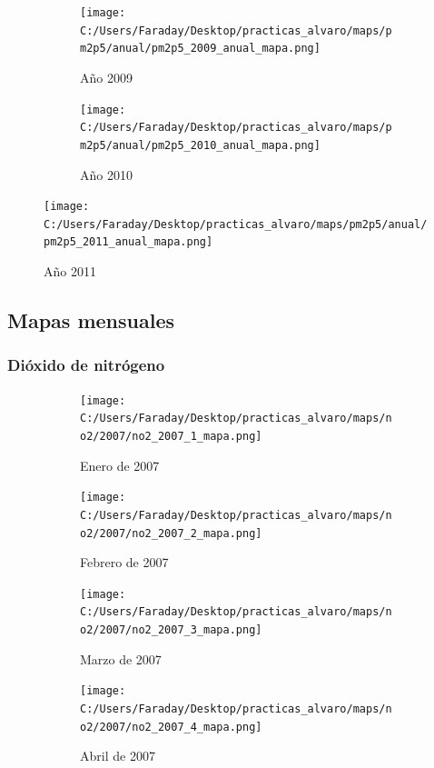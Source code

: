\documentclass[12pt]{article}
\begin{document}
\begin{figure}[H]
\centering
\begin{subfigure}[h]{0.45\textwidth}
\texttt{[image: C:/Users/Faraday/Desktop/practicas\_alvaro/maps/pm2p5/anual/pm2p5\_2009\_anual\_mapa.png]}
\caption{Año 2009}
\label{fig:map-ann-4-3}
\end{subfigure}
%
\begin{subfigure}[H]{0.45\textwidth}
\texttt{[image: C:/Users/Faraday/Desktop/practicas\_alvaro/maps/pm2p5/anual/pm2p5\_2010\_anual\_mapa.png]}
\caption{Año 2010}
\label{fig:map-ann-4-4}
\end{subfigure}
\caption{}
\end{figure}

\begin{figure}[H]
\centering
\texttt{[image: C:/Users/Faraday/Desktop/practicas\_alvaro/maps/pm2p5/anual/pm2p5\_2011\_anual\_mapa.png]}
\caption{Año 2011}
\label{fig:map-ann-4-5}
\end{figure}

\newpage

\subsection*{Mapas mensuales}
%

\subsubsection*{Dióxido de nitrógeno}
%

\begin{figure}[H]
\centering
\begin{subfigure}[h]{0.45\textwidth}
\texttt{[image: C:/Users/Faraday/Desktop/practicas\_alvaro/maps/no2/2007/no2\_2007\_1\_mapa.png]}
\caption{Enero de 2007}
\label{fig:map-mon-1-1-2007}
\end{subfigure}
%
\begin{subfigure}[H]{0.45\textwidth}
\texttt{[image: C:/Users/Faraday/Desktop/practicas\_alvaro/maps/no2/2007/no2\_2007\_2\_mapa.png]}
\caption{Febrero de 2007}
\label{fig:map-mon-1-2-2007}
\end{subfigure}
\caption{}
\end{figure}

\begin{figure}[H]
\centering
\begin{subfigure}[h]{0.45\textwidth}
\texttt{[image: C:/Users/Faraday/Desktop/practicas\_alvaro/maps/no2/2007/no2\_2007\_3\_mapa.png]}
\caption{Marzo de 2007}
\label{fig:map-mon-1-3-2007}
\end{subfigure}
%
\begin{subfigure}[H]{0.45\textwidth}
\texttt{[image: C:/Users/Faraday/Desktop/practicas\_alvaro/maps/no2/2007/no2\_2007\_4\_mapa.png]}
\caption{Abril de 2007}
\label{fig:map-mon-1-4-2007}
\end{subfigure}
\caption{}
\end{figure}
\end{document}
